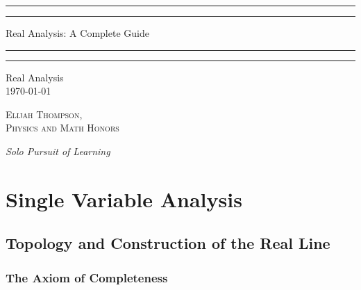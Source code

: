 \documentclass[12pt]{report}
\begin{document}

\begin{titlepage}
    \centering
    \scshape
    \vspace*{\baselineskip}
    \rule{\textwidth}{1.6pt}\vspace*{-\baselineskip}\vspace*{2pt}
    \rule{\textwidth}{0.4pt}
    
    \vspace{0.75\baselineskip}
    
    {\LARGE Real Analysis: A Complete Guide}
    
    \vspace{0.75\baselineskip}
    
    \rule{\textwidth}{0.4pt}\vspace*{-\baselineskip}\vspace{3.2pt}
    \rule{\textwidth}{1.6pt}
    
    \vspace{2\baselineskip}
    Real Analysis \\
    \vspace*{3\baselineskip}
    \monthdayyeardate\today \\
    \vspace*{5.0\baselineskip}
    
    {\scshape\Large Elijah Thompson, \\ Physics and Math Honors\\}
    
    \vspace{1.0\baselineskip}
    \textit{Solo Pursuit of Learning}
\end{titlepage}

\tableofcontents

\part{Single Variable Analysis}

\chapter{Topology and Construction of the Real Line}

\section{The Axiom of Completeness}
\end{document}
